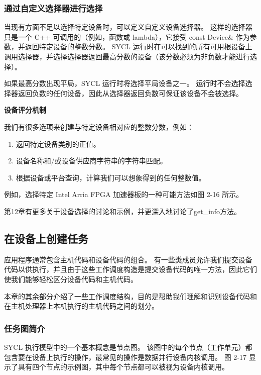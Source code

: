 \subsubsection{通过自定义选择器进行选择}
当现有方面不足以选择特定设备时，可以定义自定义设备选择器。 这样的选择器只是一个 C++ 可调用的（例如，函数或 lambda），它接受 const Device\& 作为参数，并返回特定设备的整数分数。 SYCL 运行时在可以找到的所有可用根设备上调用选择器，并选择选择器返回最高分数的设备（该分数必须为非负数才能进行选择）。

如果最高分数出现平局，SYCL 运行时将选择平局设备之一。 运行时不会选择选择器返回负数的任何设备，因此从选择器返回负数可保证该设备不会被选择。

\textbf{设备评分机制}

我们有很多选项来创建与特定设备相对应的整数分数，例如：

\begin{enumerate}
	\item 返回特定设备类别的正值。

	\item 设备名称和/或设备供应商字符串的字符串匹配。

	\item 根据设备或平台查询，计算我们可以想象得到的任何整数值。
\end{enumerate}

例如，选择特定 Intel Arria FPGA 加速器板的一种可能方法如图 2-16 所示。

第12章有更多关于设备选择的讨论和示例，并更深入地讨论了get\_info方法。

\subsection{在设备上创建任务}
应用程序通常包含主机代码和设备代码的组合。 有一些类成员允许我们提交设备代码以供执行，并且由于这些工作调度构造是提交设备代码的唯一方法，因此它们使我们能够轻松区分设备代码和主机代码。

本章的其余部分介绍了一些工作调度结构，目的是帮助我们理解和识别设备代码和在主机处理器上本机执行的主机代码之间的划分。

\subsubsection{任务图简介}
SYCL 执行模型中的一个基本概念是节点图。 该图中的每个节点（工作单元）都包含要在设备上执行的操作，最常见的操作是数据并行设备内核调用。 图 2-17 显示了具有四个节点的示例图，其中每个节点都可以被视为设备内核调用。


